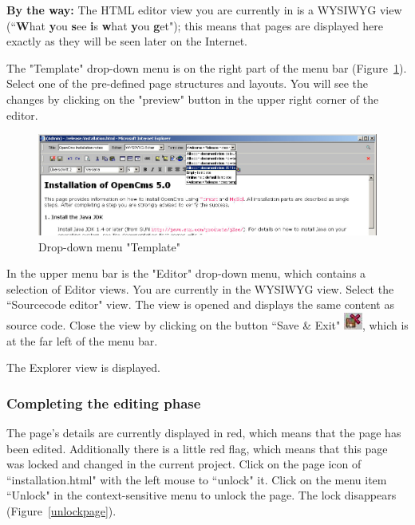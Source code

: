 \textbf{By the way:} The HTML editor view you are currently in is
a WYSIWYG view (``\textbf{W}hat \textbf{y}ou \textbf{s}ee
\textbf{i}s \textbf{w}hat \textbf{y}ou \textbf{g}et"); this means
that pages are displayed here exactly as they will be seen later
on the Internet.

The "Template" drop-down menu is on the right part of the menu bar
(Figure~\ref{selecttemplate}). Select one of the pre-defined page
structures and layouts. You will see the changes by clicking on
the "preview" button in the upper right corner of the editor.

\begin{figure}[!hbt]
\begin{center}
\includegraphics[width=\sgw]
                   {pics/usermanual/selectTemplate}
\caption[Drop-down menu "Template"]
           {Drop-down menu "Template"}
\label{selecttemplate}
\end{center}
\end{figure}

In the upper menu bar is the "Editor" drop-down menu, which
contains a selection of Editor views. You are currently in the
WYSIWYG view. Select the ``Sourcecode editor" view. The view is opened and
displays the same content as source code. Close the view by
clicking on the button ``Save \& Exit"
\includegraphics{pics/usermanual/ic_saveexit}, which is at the far
left of the menu bar.

The Explorer view is displayed.

\subsubsection{Completing the editing phase}

The page's details are currently displayed in red, which means
that the page has been edited. Additionally there is a little red
flag, which means that this page was locked and changed in the
current project. Click on the page icon of ``installation.html" with the left mouse to ``unlock" it. Click on
the menu item ``Unlock" in the context-sensitive menu to unlock the
page. The lock disappears (Figure~\ref{unlockpage}).

